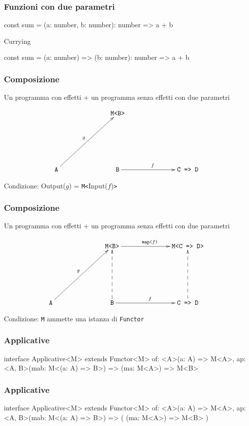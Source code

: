 \documentclass{beamer}
\newenvironment{code}
  {\vspace{0.5cm} \VerbatimEnvironment\begin{typescriptcode}}
  {\end{typescriptcode} \vspace{0.2cm}}
\begin{document}
\begin{frame}[fragile]
\frametitle{Funzioni con due parametri}

\begin{code}
const sum = (a: number, b: number): number => a + b
\end{code}

Currying

\begin{code}
const sum = (a: number) => (b: number): number => a + b
\end{code}

\end{frame}

\begin{frame}
\frametitle{Composizione}

Un programma con effetti + un programma senza effetti con due parametri

\[
\xymatrixrowsep{2.5cm}
\xymatrixcolsep{2.5cm}
\xymatrix{
  & \texttt{M<B>} \\
  \texttt{A} \ar[ur]^{g} & \texttt{B} \ar[r]^{f} & \texttt{C => D}
}
\]

Condizione: Output($g$) = \texttt{M<}Input($f$)\texttt{>}

\end{frame}

\begin{frame}
\frametitle{Composizione}

Un programma con effetti + un programma senza effetti con due parametri

\[
\xymatrixrowsep{2.5cm}
\xymatrixcolsep{2.5cm}
\xymatrix{
  & \texttt{M<B>} \ar[r]^{\texttt{map(}f\texttt{)}} & \texttt{M<C => D>} \\
  \texttt{A} \ar[ur]^{g} & \texttt{B} \ar[r]^{f} \ar@{-->}[u] & \texttt{C => D} \ar@{-->}[u]
}
\]

Condizione: \texttt{M} ammette una istanza di \texttt{Functor}

\end{frame}

\begin{frame}[fragile]
\frametitle{Applicative}

\begin{code}
interface Applicative<M> extends Functor<M> {
  of: <A>(a: A) => M<A>,
  ap: <A, B>(mab: M<(a: A) => B>) => (ma: M<A>) => M<B>
}
\end{code}

\end{frame}

\begin{frame}[fragile]
\frametitle{Applicative}

\begin{code}
interface Applicative<M> extends Functor<M> {
  of: <A>(a: A) => M<A>,
  ap: <A, B>(mab: M<(a: A) => B>) => ( (ma: M<A>) => M<B> )
}
\end{code}

\end{frame}
\end{document}
